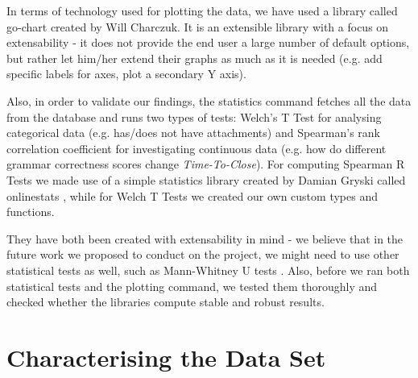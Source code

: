 \documentclass{mpaper}
\begin{document}
In terms of technology used for plotting the data, we have used a library called go-chart \cite{go-chart} created by 
Will Charczuk. It is an extensible library with a focus on extensability - it does not provide the end user a large number 
of default options, but rather let him/her extend their graphs as much as it is needed (e.g. add specific labels for axes, 
plot a secondary Y axis).

Also, in order to validate our findings, the statistics command fetches all the data from the database and runs two types of 
tests: Welch's T Test \cite{welch1947generalization} for analysing categorical data (e.g. has/does not have attachments)
and Spearman's rank correlation coefficient \cite{spearman1904proof} for investigating continuous data (e.g. how do different 
grammar correctness scores change \emph{Time-To-Close}). For computing Spearman R Tests we made use of a simple 
statistics library created by Damian Gryski called onlinestats \cite{onlinestats}, while for Welch T Tests we created our 
own custom types and functions. 

They have both been created with extensability in mind - we believe that in the future work we proposed to conduct on the 
project, we might need to use other statistical tests as well, such as Mann-Whitney U tests \cite{mann1947test}. Also, before
we ran both statistical tests and the plotting command, we tested them thoroughly and checked whether the libraries compute 
stable and robust results.

\section{Characterising the Data Set}\label{characterising}
\end{document}
